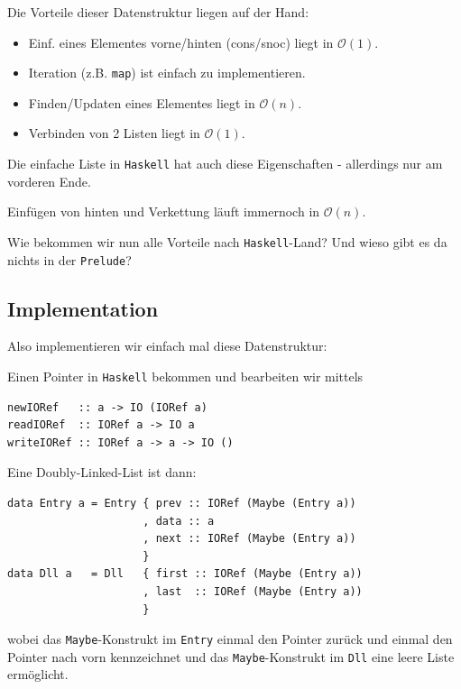\documentclass{beamer}
\begin{document}
\begin{frame}
Die Vorteile dieser Datenstruktur liegen auf der Hand:
\pause
\begin{itemize}
 \item Einf. eines Elementes vorne/hinten (cons/snoc) liegt in $\mathcal{O}(1)$.
 \pause
 \item Iteration (z.B. \texttt{map}) ist einfach zu implementieren.
 \pause
 \item Finden/Updaten eines Elementes liegt in $\mathcal{O}(n)$.
 \pause
 \item Verbinden von 2 Listen liegt in $\mathcal{O}(1)$.
\end{itemize}
\pause

Die einfache Liste in \texttt{Haskell} hat auch diese Eigenschaften - allerdings nur am vorderen Ende.\pause\bigskip

Einfügen von hinten und Verkettung läuft immernoch in $\mathcal{O}(n)$.\pause\smallskip

Wie bekommen wir nun alle Vorteile nach \texttt{Haskell}-Land? Und wieso gibt es da nichts in der \texttt{Prelude}?

\end{frame}

\subsection{Implementation}

\begin{frame}[fragile]
Also implementieren wir einfach mal diese Datenstruktur:\pause\bigskip

Einen Pointer in \texttt{Haskell} bekommen und bearbeiten wir mittels

\begin{verbatim}
newIORef   :: a -> IO (IORef a)
readIORef  :: IORef a -> IO a
writeIORef :: IORef a -> a -> IO ()
\end{verbatim}
\pause

Eine Doubly-Linked-List ist dann:
\begin{verbatim}
data Entry a = Entry { prev :: IORef (Maybe (Entry a))
                     , data :: a
                     , next :: IORef (Maybe (Entry a))
                     }
data Dll a   = Dll   { first :: IORef (Maybe (Entry a))
                     , last  :: IORef (Maybe (Entry a))
                     }
\end{verbatim}
\pause

wobei das \texttt{Maybe}-Konstrukt im \texttt{Entry} einmal den Pointer zurück und einmal den Pointer nach vorn kennzeichnet und das \texttt{Maybe}-Konstrukt im \texttt{Dll} eine leere Liste ermöglicht.
\end{frame}
\end{document}
